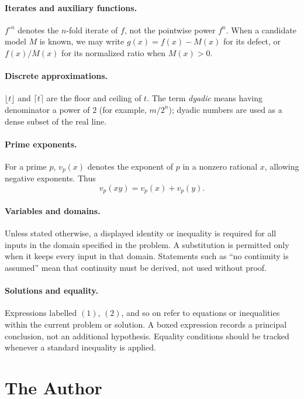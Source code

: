 \documentclass[12pt,a4paper]{article}
\begin{document}
\paragraph{Iterates and auxiliary functions.}
$f^{\circ n}$ denotes the $n$-fold iterate of $f$, not the pointwise power
$f^n$. When a candidate model $M$ is known, we may write
$g(x)=f(x)-M(x)$ for its defect, or $f(x)/M(x)$ for its normalized ratio
when $M(x)>0$.

\paragraph{Discrete approximations.}
$\lfloor t\rfloor$ and $\lceil t\rceil$ are the floor and ceiling of $t$.
The term \emph{dyadic} means having denominator a power of $2$ (for example,
$m/2^n$); dyadic numbers are used as a dense subset of the real line.

\paragraph{Prime exponents.}
For a prime $p$, $v_p(x)$ denotes the exponent of $p$ in a nonzero rational
$x$, allowing negative exponents. Thus
\[
v_p(xy)=v_p(x)+v_p(y).
\]

\paragraph{Variables and domains.}
Unless stated otherwise, a displayed identity or inequality is required for
all inputs in the domain specified in the problem. A substitution is permitted
only when it keeps every input in that domain. Statements such as ``no
continuity is assumed'' mean that continuity must be derived, not used without
proof.

\paragraph{Solutions and equality.}
Expressions labelled $(1)$, $(2)$, and so on refer to equations or inequalities
within the current problem or solution. A boxed expression records a principal
conclusion, not an additional hypothesis. Equality conditions should be
tracked whenever a standard inequality is applied.

\section*{The Author}
\end{document}
